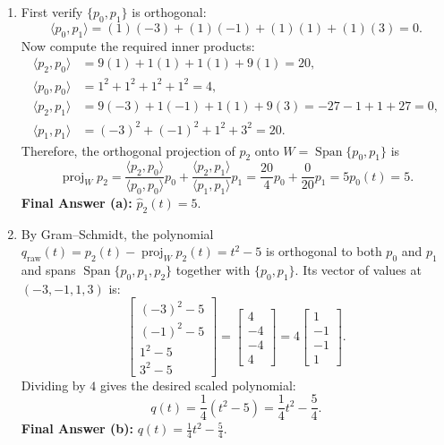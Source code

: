 \documentclass[11pt, letterpaper]{article}
\theoremstyle{definition}
\theoremstyle{remark}
\begin{document}
\begin{enumerate}[label=\textbf{\alph*.}]
    \item First verify $\{p_0, p_1\}$ is orthogonal:
    \[
        \langle p_0, p_1 \rangle = (1)(-3) + (1)(-1) + (1)(1) + (1)(3) = 0.
    \]
    Now compute the required inner products:
    \begin{align*}
        \langle p_2, p_0 \rangle &= 9(1) + 1(1) + 1(1) + 9(1) = 20, \\
        \langle p_0, p_0 \rangle &= 1^2 + 1^2 + 1^2 + 1^2 = 4, \\
        \langle p_2, p_1 \rangle &= 9(-3) + 1(-1) + 1(1) + 9(3) = -27 - 1 + 1 + 27 = 0, \\
        \langle p_1, p_1 \rangle &= (-3)^2 + (-1)^2 + 1^2 + 3^2 = 20.
    \end{align*}
    Therefore, the orthogonal projection of $p_2$ onto $W = \operatorname{Span}\{p_0, p_1\}$ is
    \[
        \operatorname{proj}_W p_2 = \frac{\langle p_2, p_0 \rangle}{\langle p_0, p_0 \rangle}p_0 + \frac{\langle p_2, p_1 \rangle}{\langle p_1, p_1 \rangle}p_1 = \frac{20}{4}p_0 + \frac{0}{20}p_1 = 5p_0(t) = 5.
    \]
    \textbf{Final Answer (a):} $\hat{p}_2(t) = 5$.

    \item By Gram--Schmidt, the polynomial $q_{\text{raw}}(t) = p_2(t) - \operatorname{proj}_W p_2(t) = t^2 - 5$ is orthogonal to both $p_0$ and $p_1$ and spans $\operatorname{Span}\{p_0, p_1, p_2\}$ together with $\{p_0, p_1\}$. Its vector of values at $(-3, -1, 1, 3)$ is:
    \[
        \begin{bmatrix} (-3)^2 - 5 \\ (-1)^2 - 5 \\ 1^2 - 5 \\ 3^2 - 5 \end{bmatrix} = \begin{bmatrix} 4 \\ -4 \\ -4 \\ 4 \end{bmatrix} = 4 \begin{bmatrix} 1 \\ -1 \\ -1 \\ 1 \end{bmatrix}.
    \]
    Dividing by $4$ gives the desired scaled polynomial:
    \[
        q(t) = \frac{1}{4}(t^2 - 5) = \frac{1}{4}t^2 - \frac{5}{4}.
    \]
    \textbf{Final Answer (b):} $\displaystyle q(t) = \frac{1}{4}t^2 - \frac{5}{4}$.
\end{enumerate}
\end{document}
